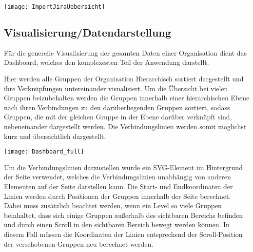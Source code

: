 \vspace{20pt}
\begin{center}
    \begin{minipage}{1\linewidth}
        \texttt{[image: ImportJiraUebersicht]}
    \end{minipage}
\end{center}
\vspace{20pt}

\subsection{Visualisierung/Datendarstellung}
Für die generelle Visualisierung der gesamten Daten einer Organisation dient das Dashboard, welches den komplexesten Teil der Anwendung darstellt.

Hier werden alle Gruppen der Organisation Hierarchisch sortiert dargestellt und ihre Verknüpfungen untereinander visualisiert.
Um die Übersicht bei vielen Gruppen beizubehalten werden die Gruppen innerhalb einer hierarchischen Ebene nach ihren Verbindungen zu den darüberliegenden Gruppen sortiert, sodass Gruppen, die mit der gleichen Gruppe in der Ebene darüber verknüpft sind, nebeneinander dargestellt werden. Die Verbindungslinien werden somit möglichst kurz und übersichtlich dargestellt.

\vspace{20pt}
\begin{center}
    \begin{minipage}{1\linewidth}
        \texttt{[image: Dashboard\_full]}
    \end{minipage}
\end{center}
\vspace{20pt}

Um die Verbindungslinien darzustellen wurde ein SVG-Element im Hintergrund der Seite verwendet, welches die Verbindungslinien unabhängig von anderen Elementen auf der Seite darstellen kann. Die Start- und Endkoordinaten der Linien werden durch Positionen der Gruppen innerhalb der Seite berechnet. Dabei muss zusätzlich beachtet werden, wenn ein Level so viele Gruppen beinhaltet, dass sich einige Gruppen außerhalb des sichtbaren Bereichs befinden und durch einen Scroll in den sichtbaren Bereich bewegt werden können. In diesem Fall müssen die Koordinaten der Linien entsprechend der Scroll-Position der verschobenen Gruppen neu berechnet werden.

